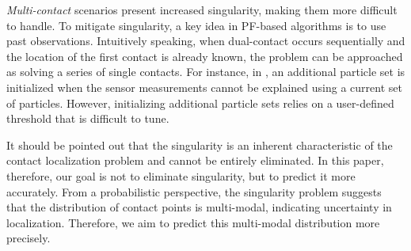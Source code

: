 \textit{Multi-contact} scenarios present increased singularity, making them more difficult to handle.
To mitigate singularity, a key idea in PF-based algorithms is to use past observations.
Intuitively speaking, when dual-contact occurs sequentially and the location of the first contact is already known, the problem can be approached as solving a series of single contacts.
For instance, in \cite{10161173, manuelli2016localizing}, an additional particle set is initialized when the sensor measurements cannot be explained using a current set of particles.
However, initializing additional particle sets relies on a user-defined threshold that is difficult to tune. 


It should be pointed out that the singularity is an inherent characteristic of the contact localization problem and cannot be entirely eliminated.
In this paper, therefore, our goal is not to eliminate singularity, but to predict it more accurately.
From a probabilistic perspective, the singularity problem suggests that the distribution of contact points is multi-modal, indicating uncertainty in localization.
Therefore, we aim to predict this multi-modal distribution more precisely.